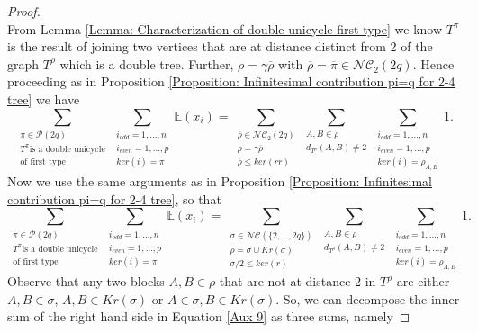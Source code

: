 \documentclass{article}
\theoremstyle{definition}
\newcommand{\E}{\mathbb{E}}
\newcommand{\cP}{\mathcal{P}}
\newcommand{\NC}{\mathcal{NC}}
\begin{document}
{\begin{proof}
\begin{equation*}
\end{equation*}
From Lemma \ref{Lemma: Characterization of double unicycle first type} we know $T^\pi$ is the result of joining two vertices that are at distance distinct from 2 of the graph $T^\rho$ which is a double tree. Further, $\rho=\gamma\overline{\rho}$ with $\overline{\rho}=\overline{\pi}\in \NC_2(2q)$. Hence proceeding as in Proposition \ref{Proposition: Infinitesimal contribution pi=q for 2-4 tree} we have
\begin{equation*}
\sum_{\substack{\pi\in \cP(2q)\\ T^\pi \text{is a double unicycle} \\ \text{of first type} }}\sum_{\substack{i_{odd}=1,\dots,n \\ i_{even}=1,\dots,p \\ ker(i)=\pi}}\E(x_i)= \sum_{\substack{\overline{\rho}\in \NC_2(2q)\\ \rho=\gamma\overline{\rho} \\ \overline{\rho}\leq ker(rr)}}\sum_{\substack{A,B\in \rho \\ d_{T^\rho}(A,B)\neq 2}}\sum_{\substack{i_{odd}=1,\dots,n \\ i_{even}=1,\dots,p \\ ker(i)=\rho_{A,B}}}1.
\end{equation*}
Now we use the same arguments as in Proposition \ref{Proposition: Infinitesimal contribution pi=q for 2-4 tree}, so that
\begin{equation}\label{Aux 9}
\sum_{\substack{\pi\in \cP(2q)\\ T^\pi \text{is a double unicycle} \\ \text{of first type} }}\sum_{\substack{i_{odd}=1,\dots,n \\ i_{even}=1,\dots,p \\ ker(i)=\pi}}\E(x_i)= \sum_{\substack{\sigma\in \NC(\{2,\dots,2q\})\\ \rho=\sigma\cup Kr(\sigma) \\ \sigma/2\leq ker(r)}}\sum_{\substack{A,B\in \rho \\ d_{T^\rho}(A,B)\neq 2}}\sum_{\substack{i_{odd}=1,\dots,n \\ i_{even}=1,\dots,p \\ ker(i)=\rho_{A,B}}}1.
\end{equation}
Observe that any two blocks $A,B\in\rho$ that are not at distance 2 in $T^\rho$ are either $A,B\in\sigma$, $A,B\in Kr(\sigma)$ or $A\in \sigma,B\in Kr(\sigma)$. So, we can decompose the inner sum of the right hand side in Equation \ref{Aux 9} as three sums, namely

\end{proof}}
\end{document}
